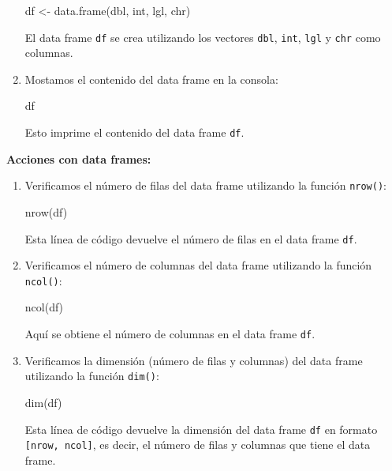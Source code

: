 \documentclass[
  jou,
  floatsintext,
  longtable,
  a4paper,
  nolmodern,
  notxfonts,
  notimes,
  colorlinks=true,linkcolor=blue,citecolor=blue,urlcolor=blue]{apa7}
\newenvironment{Shaded}{\begin{snugshade}}{\end{snugshade}}
\newcommand{\FunctionTok}[1]{\textcolor[rgb]{0.28,0.35,0.67}{#1}}
\newcommand{\NormalTok}[1]{\textcolor[rgb]{0.00,0.23,0.31}{#1}}
\newcommand{\OtherTok}[1]{\textcolor[rgb]{0.00,0.23,0.31}{#1}}
\begin{document}
\begin{enumerate}
\begin{Shaded}
\begin{Highlighting}[]
\NormalTok{df }\OtherTok{\textless{}{-}} \FunctionTok{data.frame}\NormalTok{(dbl, int, lgl, chr)}
\end{Highlighting}
\end{Shaded}

  El data frame \texttt{df} se crea utilizando los vectores
  \texttt{dbl}, \texttt{int}, \texttt{lgl} y \texttt{chr} como columnas.
\item
  Mostamos el contenido del data frame en la consola:

\begin{Shaded}
\begin{Highlighting}[]
\NormalTok{df}
\end{Highlighting}
\end{Shaded}

  Esto imprime el contenido del data frame \texttt{df}.
\end{enumerate}

\textbf{Acciones con data frames:}

\begin{enumerate}
\def\labelenumi{\arabic{enumi}.}
\item
  Verificamos el número de filas del data frame utilizando la función
  \texttt{nrow()}:

\begin{Shaded}
\begin{Highlighting}[]
\FunctionTok{nrow}\NormalTok{(df)}
\end{Highlighting}
\end{Shaded}

  Esta línea de código devuelve el número de filas en el data frame
  \texttt{df}.
\item
  Verificamos el número de columnas del data frame utilizando la función
  \texttt{ncol()}:

\begin{Shaded}
\begin{Highlighting}[]
\FunctionTok{ncol}\NormalTok{(df)}
\end{Highlighting}
\end{Shaded}

  Aquí se obtiene el número de columnas en el data frame \texttt{df}.
\item
  Verificamos la dimensión (número de filas y columnas) del data frame
  utilizando la función \texttt{dim()}:

\begin{Shaded}
\begin{Highlighting}[]
\FunctionTok{dim}\NormalTok{(df)}
\end{Highlighting}
\end{Shaded}

  Esta línea de código devuelve la dimensión del data frame \texttt{df}
  en formato \texttt{{[}nrow,\ ncol{]}}, es decir, el número de filas y
  columnas que tiene el data frame.
\end{enumerate}
\end{document}
